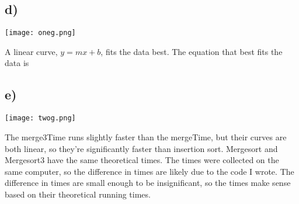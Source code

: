 \documentclass{article}
\begin{document}
\subsection*{d)}

\texttt{[image: oneg.png]}

A linear curve, $y = mx+b$, fits the data best.
The equation that best fits the data is 

\subsection*{e)}

\texttt{[image: twog.png]}

The merge3Time runs slightly faster than the mergeTime, but their curves are both linear, so they're significantly faster than insertion sort.  Mergesort and Mergesort3 have the same theoretical times.  The times were collected on the same computer, so the difference in times are likely due to the code I wrote.  The difference in times are small enough to be insignificant, so the times make sense based on their theoretical running times.
\end{document}
